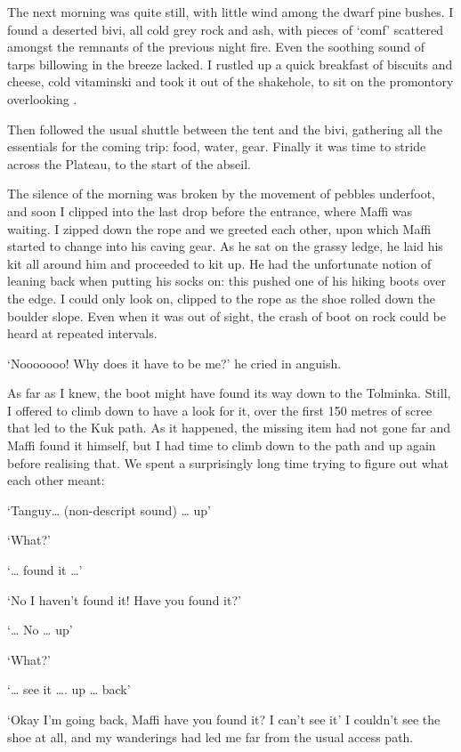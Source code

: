 The next morning was quite still, with little wind among the dwarf pine bushes. I found a deserted bivi, all cold grey rock and ash, with pieces of `comf' scattered amongst the remnants of the previous night fire. Even the soothing sound of tarps billowing in the breeze lacked. I rustled up a quick breakfast of biscuits and cheese, cold vitaminski and took it out of the shakehole, to sit on the promontory overlooking . 

Then followed the usual shuttle between the tent and the bivi, gathering all the essentials for the coming trip: food, water, gear. Finally it was time to stride across the Plateau, to the start of the abseil. 

The silence of the morning was broken by the movement of pebbles underfoot, and soon I clipped into the last drop before the entrance, where Maffi was waiting. I zipped down the rope and we greeted each other, upon which Maffi started to change into his caving gear. As he sat on the grassy ledge, he laid his kit all around him and proceeded to kit up. He had the unfortunate notion of leaning back when putting his socks on: this pushed one of his hiking boots over the edge. I could only look on, clipped to the rope as the shoe rolled down the boulder slope. Even when it was out of sight, the crash of boot on rock could be heard at repeated intervals. 

`Nooooooo! Why does it have to be me?' he cried in anguish. 

As far as I knew, the boot might have found its way down to the Tolminka. Still, I offered to climb down to have a look for it, over the first 150 metres of scree that led to the Kuk path. As it happened, the missing item had not gone far and Maffi found it himself, but I had time to climb down to the path and up again before realising that. We spent a surprisingly long time trying to figure out what each other meant: 

`Tanguy… (non-descript sound) …  up' 

`What?' 

`… found it …' 

`No I haven't found it! Have you found it?' 

 `… No … up'  
 
`What?' 

`… see it …. up … back' 

`Okay I'm going back, Maffi have you found it? I can't see it'  I couldn't see the shoe at all, and my wanderings had led me far from the usual access path.

